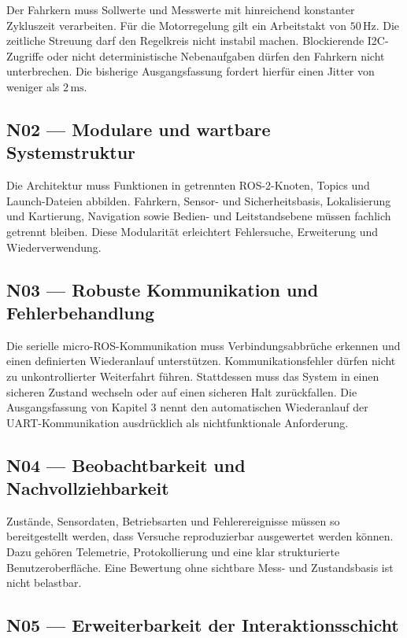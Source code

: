 Der Fahrkern muss Sollwerte und Messwerte mit hinreichend konstanter Zykluszeit verarbeiten. Für die Motorregelung gilt ein Arbeitstakt von $50\,\mathrm{Hz}$. Die zeitliche Streuung darf den Regelkreis nicht instabil machen. Blockierende I2C-Zugriffe oder nicht deterministische Nebenaufgaben dürfen den Fahrkern nicht unterbrechen. Die bisherige Ausgangsfassung fordert hierfür einen Jitter von weniger als $2\,\mathrm{ms}$.

\subsection{N02 — Modulare und wartbare Systemstruktur}

Die Architektur muss Funktionen in getrennten ROS-2-Knoten, Topics und Launch-Dateien abbilden. Fahrkern, Sensor- und Sicherheitsbasis, Lokalisierung und Kartierung, Navigation sowie Bedien- und Leitstandsebene müssen fachlich getrennt bleiben. Diese Modularität erleichtert Fehlersuche, Erweiterung und Wiederverwendung.

\subsection{N03 — Robuste Kommunikation und Fehlerbehandlung}

Die serielle micro-ROS-Kommunikation muss Verbindungsabbrüche erkennen und einen definierten Wiederanlauf unterstützen. Kommunikationsfehler dürfen nicht zu unkontrollierter Weiterfahrt führen. Stattdessen muss das System in einen sicheren Zustand wechseln oder auf einen sicheren Halt zurückfallen. Die Ausgangsfassung von Kapitel 3 nennt den automatischen Wiederanlauf der UART-Kommunikation ausdrücklich als nichtfunktionale Anforderung.

\subsection{N04 — Beobachtbarkeit und Nachvollziehbarkeit}

Zustände, Sensordaten, Betriebsarten und Fehlerereignisse müssen so bereitgestellt werden, dass Versuche reproduzierbar ausgewertet werden können. Dazu gehören Telemetrie, Protokollierung und eine klar strukturierte Benutzeroberfläche. Eine Bewertung ohne sichtbare Mess- und Zustandsbasis ist nicht belastbar.

\subsection{N05 — Erweiterbarkeit der Interaktionsschicht}

